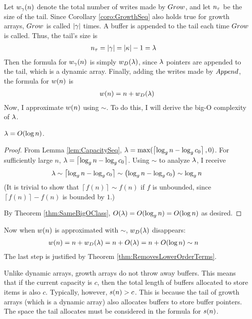 Let ${w}_{\gamma}(n)$ denote the total number of writes made by $Grow$, and let $n_\tau$ be the size of the tail. Since Corollary \ref{coro:GrowthSeq} also holds true for growth arrays, $Grow$ is called $|\gamma|$ times. A buffer is appended to the tail each time $Grow$ is called. Thus, the tail's size is
\begin{align*}
n_\tau &= |\gamma| = |\kappa| - 1 = \lambda
\end{align*}
Then the formula for ${w}_{\gamma}(n)$ is simply $w_D(\lambda)$, since $\lambda$ pointers are appended to the tail, which is a dynamic array. Finally, adding the writes made by $Append$, the formula for $w(n)$ is
\begin{align*}
w(n) = n + w_D(\lambda)
\end{align*}
Now, I approximate $w(n)$ using $\sim$. To do this, I will derive the big-O complexity of $\lambda$.

\begin{lemma}
\label{lem:VarUsefulIsOLogN}
	$\lambda = O(\log n)$.
\end{lemma}

\begin{proof}
	From Lemma \ref{lem:CapacitySeq}, $\lambda = \max(\left\lceil \log_{g} n - \log_{g} c_0 \right\rceil, 0)$. For sufficiently large $n$, $\lambda = \left\lceil \log_{g} n - \log_{g} c_0 \right\rceil$. Using $\sim$ to analyze $\lambda$, I receive
	\begin{align*}
	\lambda \sim \left\lceil \log_{g} n - \log_{g} c_0 \right\rceil \sim \left( \log_{g} n - \log_{g} c_0 \right) \sim \log_{g} n
	\end{align*}
	(It is trivial to show that $\left\lceil f(n) \right\rceil \sim f(n)$ if $f$ is unbounded, since $\left\lceil f(n) \right\rceil - f(n)$ is bounded by $1$.)
	
	By Theorem \ref{thm:SameBigOClass}, $O(\lambda) = O(\log_{g} n) = O(\log n)$ as desired.
\end{proof}

Now when $w(n)$ is approximated with $\sim$, $w_D(\lambda)$ disappears:
\begin{align*}
w(n) &= n + w_D(\lambda) = n + O(\lambda) = n + O(\log n) \sim n
\end{align*}
The last step is justified by Theorem \ref{thm:RemovesLowerOrderTerms}.

\HdrSpaceComplex

Unlike dynamic arrays, growth arrays do not throw away buffers. This means that if the current capacity is $c$, then the total length of buffers allocated to store items is also $c$. Typically, however, $s(n) > c$. This is because the tail of growth arrays (which is a dynamic array) also allocates buffers to store buffer pointers. The space the tail allocates must be considered in the formula for $s(n)$.

